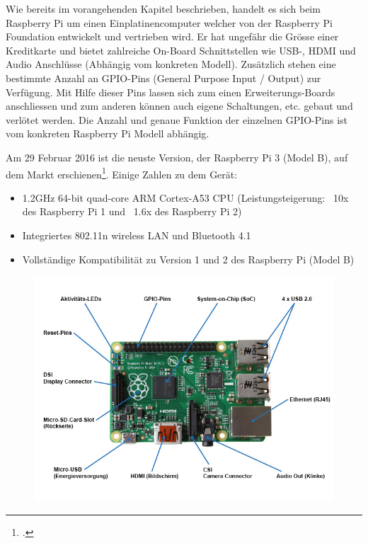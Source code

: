 Wie bereits im vorangehenden Kapitel beschrieben, handelt es sich beim Raspberry Pi um einen Einplatinencomputer welcher von der Raspberry Pi Foundation entwickelt und vertrieben wird. Er hat ungefähr die Grösse einer Kreditkarte und bietet zahlreiche On-Board Schnittstellen wie USB-, HDMI und Audio Anschlüsse (Abhängig vom konkreten Modell). Zusätzlich stehen eine bestimmte Anzahl an GPIO-Pins (General Purpose Input / Output) zur Verfügung. Mit Hilfe dieser Pins lassen sich zum einen Erweiterungs-Boards anschliessen und zum anderen können auch eigene Schaltungen, etc. gebaut und verlötet werden. Die Anzahl und genaue Funktion der einzelnen GPIO-Pins ist vom konkreten Raspberry Pi Modell abhängig.

Am 29 Februar 2016 ist die neuste Version, der Raspberry Pi 3 (Model B), auf dem Markt erschienen\footcite{Raspberry_Pi_3_2016-04-24}. Einige Zahlen zu dem Gerät:

\begin{itemize}
\item 1.2GHz 64-bit quad-core ARM Cortex-A53 CPU (Leistungsteigerung: ~10x des Raspberry Pi 1 und ~1.6x des Raspberry Pi 2)
\item Integriertes 802.11n wireless LAN und Bluetooth 4.1
\item Vollständige Kompatibilität zu Version 1 und 2 des Raspberry Pi (Model B)
\end{itemize} 


\begin{figure}[H]
  \centering
  \includegraphics[width=13cm]{./images/RaspberryPi2ModelBPlusOverview}
\end{figure}

